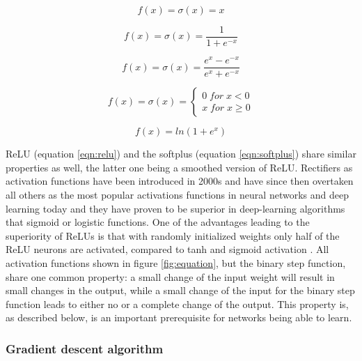 \begin{equation}
 f(x) = \sigma(x) = x
 \label{eqn:ident}
\end{equation}

       
\begin{equation}
 f(x) = \sigma(x) = \frac{1}{1+e^{-x}} 
 \label{eqn:sigmoid}
\end{equation}

\begin{equation}
 f(x) = \sigma(x) = \frac{e^x - e^{-x}}{e^x + e^{-x}}
 \label{eqn:tanh}
\end{equation}


\begin{equation}
 f(x)= \sigma(x) = \left\{
 \begin{array}{ll}
  0 \; for \; x < 0 \\ 
  x \; for \; x \geq 0
 \end{array}
\right .
\label{eqn:relu}
\end{equation}


\begin{equation}
 f(x) = ln(1+e^x)
 \label{eqn:softplus}
\end{equation}


ReLU (equation \ref{eqn:relu}) and the softplus (equation \ref{eqn:softplus}) share similar properties as
well, the latter one being a smoothed version of ReLU. Rectifiers as activation functions have been introduced
in 2000s \cite{hahnloser2000digital} and have since then overtaken all others as the most popular activations
functions in neural networks and deep learning today \cite{lecun2015deep} and they have proven to be superior
in deep-learning algorithms that sigmoid or logistic functions. One of the advantages leading to the
superiority of ReLUs is that with randomly initialized weights only half of the ReLU neurons are activated,
compared to tanh and sigmoid activation \cite{glorot2011deep}. All activation functions shown in figure
\ref{fig:equation}, but the binary step function, share one common property: a small change of the input
weight will result in small changes in the output, while a small change of the input for the binary step
function leads to either no or a complete change of the output. This property is, as described below, is an
important prerequisite for networks being able to learn. \\

\subsubsection{Gradient descent algorithm}


